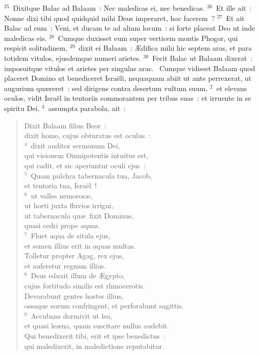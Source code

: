 ${}^{25}$~Dixitque Balac ad Balaam~: Nec maledicas ei, nec benedicas.
${}^{26}$~Et ille ait~: Nonne dixi tibi quod quidquid mihi Deus imperaret, hoc facerem~?
${}^{27}$~Et ait Balac ad eum~: Veni, et ducam te ad alium locum~: si forte placeat Deo ut inde maledicas eis.
${}^{28}$~Cumque duxisset eum super verticem montis Phogor, qui respicit solitudinem,
${}^{29}$~dixit ei Balaam~: \AE difica mihi hic septem aras, et para totidem vitulos, ejusdemque numeri arietes.
${}^{30}$~Fecit Balac ut Balaam dixerat~: imposuitque vitulos et arietes per singulas aras.
~\lettrine[lines=10,image=true,loversize=0.05,lraise=-0.03]{C}{}umque vidisset Balaam quod placeret Domino ut benediceret Isra\"eli, nequaquam abiit ut ante perrexerat, ut augurium qu\ae reret~: sed dirigens contra desertum vultum suum,
${}^{2}$~et elevans oculos, vidit Isra\"el in tentoriis commorantem per tribus suas~: et irruente in se spiritu Dei,
${}^{3}$~assumpta parabola, ait~: \begin{flushleft}\begin{verse}Dixit Balaam filius Beor~:\\ dixit homo, cujus obturatus est oculus~:\\
${}^{4}$~dixit auditor sermonum Dei,\\ qui visionem Omnipotentis intuitus est,\\ qui cadit, et sic aperiuntur oculi ejus~:\\
${}^{5}$~Quam pulchra tabernacula tua, Jacob,\\ et tentoria tua, Isra\"el~!\\
${}^{6}$~ut valles nemoros\ae ,\\ ut horti juxta fluvios irrigui,\\ ut tabernacula qu\ae\ fixit Dominus,\\ quasi cedri prope aquas.\\
${}^{7}$~Fluet aqua de situla ejus,\\ et semen illius erit in aquas multas.\\ Tolletur propter Agag, rex ejus,\\ et auferetur regnum illius.\\
${}^{8}$~Deus eduxit illum de \AE gypto,\\ cujus fortitudo similis est rhinocerotis.\\ Devorabunt gentes hostes illius,\\ ossaque eorum confringent, et perforabunt sagittis.\\
${}^{9}$~Accubans dormivit ut leo,\\ et quasi le\ae na, quam suscitare nullus audebit.\\ Qui benedixerit tibi, erit et ipse benedictus~:\\ qui maledixerit, in maledictione reputabitur.\end{verse}\end{flushleft}


